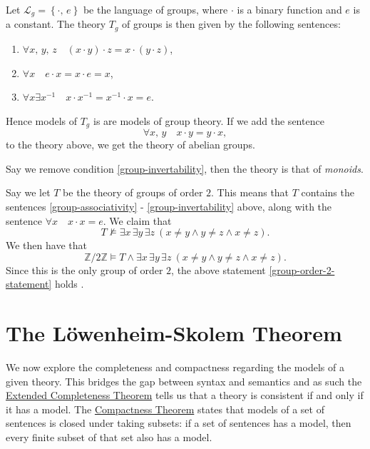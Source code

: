 \documentclass[../../main.tex]{subfiles}
\begin{document}
\begin{example}\cite[Example 1.2.5]{Mar02}
    Let $\mathcal{L}_g = \left\{\cdot,\, e\right\}$ be the language of groups,
    where $\cdot$ is a binary function and $e$ is a constant.
    The theory $T_g$ of groups is then given by the following sentences:
    \begin{enumerate}[label=(\roman*)]
        \item \label{group-associativity} $\forall x,\, y,\, z \quad (x \cdot y) \cdot z = x \cdot (y \cdot z)$,
        \item \label{group-identity}      $\forall x \quad e \cdot x = x \cdot e = x$,
        \item \label{group-invertability} $\forall x \exists x^{-1} \quad x \cdot x^{-1} = x^{-1} \cdot x = e$.
    \end{enumerate}
    Hence models of $T_g$ is are models of group theory.
    If we add the sentence $$\forall x,\, y \quad x \cdot y = y \cdot x,$$ to the theory above,
    we get the theory of abelian groups.
                    
    Say we remove condition \ref{group-invertability}, then the theory is that of \emph{monoids}.

    Say we let $T$ be the theory of groups of order $2$.
    This means that $T$ contains the sentences \ref{group-associativity} - \ref{group-invertability} above,
    along with the sentence $\forall x \quad x \cdot x = e$.
    We claim that 
    \begin{equation}\label{group-order-2-statement}
        T \not\models \exists x\, \exists y\, \exists z \ \left(x \neq y \wedge y \neq z \wedge x \neq z\right).
    \end{equation}
    We then have that $$\mathbb{Z} / 2 \mathbb{Z} \models T \wedge \exists x\, \exists y\, \exists z \ \left(x \neq y \wedge y \neq z \wedge x \neq z\right).$$
    Since this is the only group of order $2$, the above statement \eqref{group-order-2-statement} holds \cite[Proposition 1.2.13]{Mar02}.
\end{example}
\section{The Löwenheim-Skolem Theorem}

We now explore the completeness and compactness regarding the models of a given theory.
This bridges the gap between syntax and semantics and as such
the \hyperref[completeness-thm]{Extended Completeness Theorem} tells us that a theory is consistent if and only if it has a model.
The \hyperref[compactness-thm]{Compactness Theorem} states that models of a set of sentences is closed under taking subsets:
if a set of sentences has a model, then every finite subset of that set also has a model.
\end{document}
